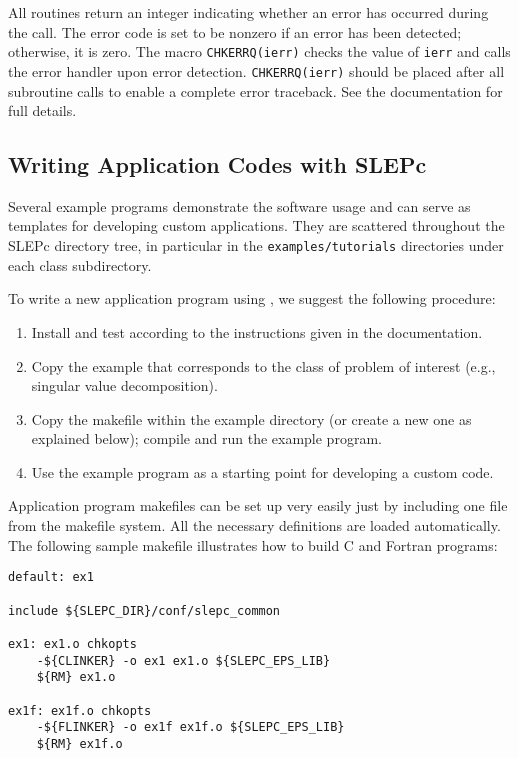 	All \slepc routines return an integer indicating whether an error has occurred during the call. The error code is set to be nonzero if an error has been detected; otherwise, it is zero. The \petsc macro \Verb!CHKERRQ(ierr)! checks the value of \Verb!ierr! and calls the \petsc error handler upon error detection. \Verb!CHKERRQ(ierr)! should be placed after all subroutine calls to enable a complete error traceback. See the \petsc documentation for full details.

\subsection{Writing Application Codes with SLEPc}

Several example programs demonstrate the software usage and can serve as templates for developing custom applications. They are scattered throughout the SLEPc directory tree, in particular in the \Verb!examples/tutorials! directories under each class subdirectory.

To write a new application program using \slepc, we suggest the following procedure:
\begin{enumerate}
\item Install and test \slepc according to the instructions given in the documentation.
\item Copy the \slepc example that corresponds to the class of problem of interest (e.g., singular value decomposition).
\item Copy the makefile within the example directory (or create a new one as explained below); compile and run the example program.
\item Use the example program as a starting point for developing a custom code.
\end{enumerate}

	Application program makefiles can be set up very easily just by including one file from the \slepc makefile system. All the necessary \petsc{} definitions are loaded automatically. The following sample makefile illustrates how to build C and Fortran programs:

	\begin{Verbatim}[fontsize=\small]
default: ex1

include ${SLEPC_DIR}/conf/slepc_common

ex1: ex1.o chkopts
	-${CLINKER} -o ex1 ex1.o ${SLEPC_EPS_LIB}
	${RM} ex1.o

ex1f: ex1f.o chkopts
	-${FLINKER} -o ex1f ex1f.o ${SLEPC_EPS_LIB}
	${RM} ex1f.o
	\end{Verbatim}


